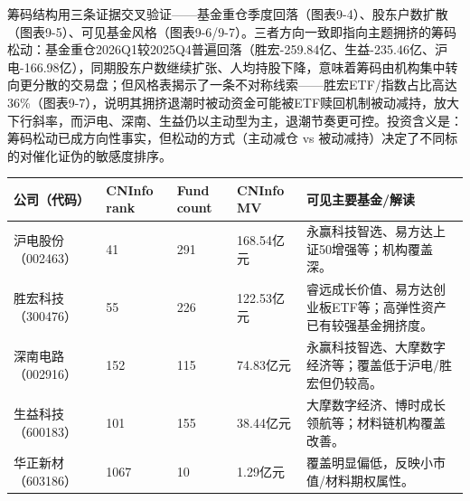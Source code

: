 筹码结构用三条证据交叉验证——基金重仓季度回落（图表9-4）、股东户数扩散（图表9-5）、可见基金风格（图表9-6/9-7）。三者方向一致即指向主题拥挤的筹码松动：基金重仓2026Q1较2025Q4普遍回落（胜宏-259.84亿、生益-235.46亿、沪电-166.98亿），同期股东户数继续扩张、人均持股下降，意味着筹码由机构集中转向更分散的交易盘；但风格表揭示了一条不对称线索——胜宏ETF/指数占比高达36\%（图表9-7），说明其拥挤退潮时被动资金可能被ETF赎回机制被动减持，放大下行斜率，而沪电、深南、生益仍以主动型为主，退潮节奏更可控。投资含义是：筹码松动已成方向性事实，但松动的方式（主动减仓 vs 被动减持）决定了不同标的对催化证伪的敏感度排序。

\begin{exhibitbox}
\footnotesize
\begin{tabularx}{\textwidth}{L{1.8cm}R{1.5cm}R{1.8cm}R{1.8cm}X}
\toprule
\textbf{公司（代码）} & \textbf{CNInfo rank} & \textbf{Fund count} & \textbf{CNInfo MV} & \textbf{可见主要基金/解读} \\
\midrule
沪电股份（002463） & 41 & 291 & 168.54亿元 & 永赢科技智选、易方达上证50增强等；机构覆盖深。 \\
胜宏科技（300476） & 55 & 226 & 122.53亿元 & 睿远成长价值、易方达创业板ETF等；高弹性资产已有较强基金拥挤度。 \\
深南电路（002916） & 152 & 115 & 74.83亿元 & 永赢科技智选、大摩数字经济等；覆盖低于沪电/胜宏但仍较高。 \\
生益科技（600183） & 101 & 155 & 38.44亿元 & 大摩数字经济、博时成长领航等；材料链机构覆盖改善。 \\
华正新材（603186） & 1067 & 10 & 1.29亿元 & 覆盖明显偏低，反映小市值/材料期权属性。 \\
\bottomrule
\end{tabularx}
\end{exhibitbox}

